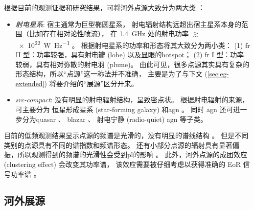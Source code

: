 根据目前的观测证据和研究结果，可将河外点源大致分为两大类 \cite{padovani2016}：
\begin{itemize}
  \item \emph{射电星系}:
    宿主通常为巨型椭圆星系，
    射电辐射结构远超出宿主星系本身的范围（比如存在相对论性喷流），
    在 \SI{1.4}{\GHz} 处的射电功率 $\gtrsim$\,\SI{e22}{\watt\per\hertz}
    \cite{ledlow1996}。
     根据射电星系的功率和形态将其大致分为两小类：
    (1) \ac{fr} II 型：功率较强，具有射电瓣 (lobe) 以及显眼的\ac{hotspot}；
    (2) \ac{fr} I 型：功率较弱，具有相对弥散的射电羽 (plume)。
    由此可见，很多点源其实具有复杂的形态结构，所以\enquote{点源}这一称法并不准确，
    主要是为了与下文 (\autoref{sec:eg-extended})
    将要介绍的\enquote{展源}区分开来。

  \item \emph{\ac{src-compact}}:
    没有明显的射电辐射结构，呈致密点状。
    根据射电辐射的来源，可主要分为
    恒星形成星系 (star-forming galaxy) \cite{condon1992}
    和\ac{agn} \cite{urry1995,antonucci1993,padovani2017}。
    同时 \ac{agn} 还可进一步分为\ac{quasar} \cite{barthel1989,antonucci1993}、
    \ac{blazar} \cite{giommi2012,giommi2013}、
    射电宁静 (radio-quiet) \ac{agn} \cite{sandage1965,wilson1995} 等子类。
\end{itemize}

目前的低频观测结果显示点源的频谱是光滑的，没有明显的谱线结构 \cite{offringa2016}。
但是不同类别的点源具有不同的谱指数和频谱形态。
还有小部分点源的辐射具有显著偏振，所以观测得到的频谱的光滑性会受到\ac{pl}的影响
\cite{geil2011,vanEck2018}。
此外，河外点源的成团效应 (clustering effect) 会改变其功率谱，
该效应需要被仔细考虑以获得准确的 EoR 信号功率谱
\cite{diMatteo2002,diMatteo2004,liu2011,alonso2015,murray2017}。

\subsection{河外展源}
\label{sec:eg-extended}

